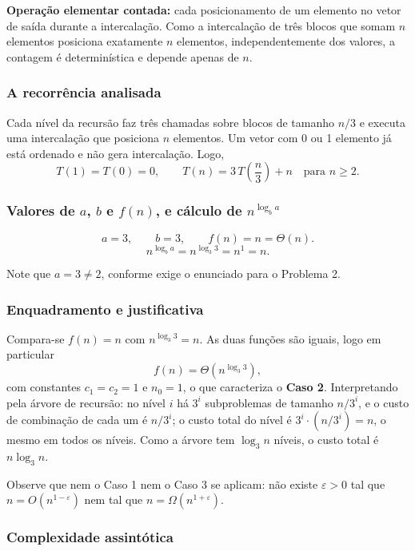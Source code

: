 \documentclass[11pt,a4paper]{article}
\begin{document}
\textbf{Operação elementar contada:} cada posicionamento de um elemento no vetor de saída durante a intercalação. Como a intercalação de três blocos que somam $n$ elementos posiciona exatamente $n$ elementos, independentemente dos valores, a contagem é determinística e depende apenas de $n$.

\subsubsection{A recorrência analisada}

Cada nível da recursão faz três chamadas sobre blocos de tamanho $n/3$ e executa uma intercalação que posiciona $n$ elementos. Um vetor com 0 ou 1 elemento já está ordenado e não gera intercalação. Logo,
\begin{equation}
T(1)=T(0)=0,\qquad T(n)=3\,T\!\left(\frac n3\right)+n\quad\text{para }n\ge2.
\label{eq:rec2}
\end{equation}

\subsubsection{Valores de $a$, $b$ e $f(n)$, e cálculo de $n^{\log_b a}$}

\[
a=3,\qquad b=3,\qquad f(n)=n=\Theta(n).
\]
\[
n^{\log_b a}=n^{\log_3 3}=n^{1}=n.
\]

Note que $a=3\neq2$, conforme exige o enunciado para o Problema 2.

\subsubsection{Enquadramento e justificativa}

Compara-se $f(n)=n$ com $n^{\log_3 3}=n$. As duas funções são iguais, logo em particular
\[
f(n)=\Theta\!\left(n^{\log_3 3}\right),
\]
com constantes $c_1=c_2=1$ e $n_0=1$, o que caracteriza o \textbf{Caso 2}. Interpretando pela árvore de recursão: no nível $i$ há $3^i$ subproblemas de tamanho $n/3^i$, e o custo de combinação de cada um é $n/3^i$; o custo total do nível é $3^i\cdot(n/3^i)=n$, o mesmo em todos os níveis. Como a árvore tem $\log_3 n$ níveis, o custo total é $n\log_3 n$.

Observe que nem o Caso 1 nem o Caso 3 se aplicam: não existe $\varepsilon>0$ tal que $n=O(n^{1-\varepsilon})$ nem tal que $n=\Omega(n^{1+\varepsilon})$.

\subsubsection{Complexidade assintótica}
\end{document}
